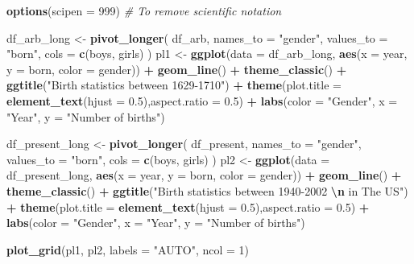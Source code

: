 \documentclass[11pt,a4paper,]{article}
\newenvironment{Shaded}{\begin{snugshade}}{\end{snugshade}}
\newcommand{\AttributeTok}[1]{\textcolor[rgb]{0.13,0.29,0.53}{#1}}
\newcommand{\CommentTok}[1]{\textcolor[rgb]{0.56,0.35,0.01}{\textit{#1}}}
\newcommand{\DecValTok}[1]{\textcolor[rgb]{0.00,0.00,0.81}{#1}}
\newcommand{\FloatTok}[1]{\textcolor[rgb]{0.00,0.00,0.81}{#1}}
\newcommand{\FunctionTok}[1]{\textcolor[rgb]{0.13,0.29,0.53}{\textbf{#1}}}
\newcommand{\NormalTok}[1]{#1}
\newcommand{\OtherTok}[1]{\textcolor[rgb]{0.56,0.35,0.01}{#1}}
\newcommand{\SpecialCharTok}[1]{\textcolor[rgb]{0.81,0.36,0.00}{\textbf{#1}}}
\newcommand{\StringTok}[1]{\textcolor[rgb]{0.31,0.60,0.02}{#1}}
\begin{document}
\begin{Shaded}
\begin{Highlighting}[]
\FunctionTok{options}\NormalTok{(}\AttributeTok{scipen =} \DecValTok{999}\NormalTok{) }\CommentTok{\# To remove scientific notation}

\NormalTok{df\_arb\_long }\OtherTok{\textless{}{-}}
  \FunctionTok{pivot\_longer}\NormalTok{(}
\NormalTok{    df\_arb,}
    \AttributeTok{names\_to =} \StringTok{"gender"}\NormalTok{,}
    \AttributeTok{values\_to =} \StringTok{"born"}\NormalTok{,}
    \AttributeTok{cols =} \FunctionTok{c}\NormalTok{(boys, girls)}
\NormalTok{  )}
\NormalTok{pl1 }\OtherTok{\textless{}{-}}
  \FunctionTok{ggplot}\NormalTok{(}\AttributeTok{data =}\NormalTok{ df\_arb\_long, }\FunctionTok{aes}\NormalTok{(}\AttributeTok{x =}\NormalTok{ year, }\AttributeTok{y =}\NormalTok{ born, }\AttributeTok{color =}\NormalTok{ gender)) }\SpecialCharTok{+} 
  \FunctionTok{geom\_line}\NormalTok{() }\SpecialCharTok{+} \FunctionTok{theme\_classic}\NormalTok{() }\SpecialCharTok{+} 
  \FunctionTok{ggtitle}\NormalTok{(}\StringTok{"Birth statistics between 1629{-}1710"}\NormalTok{) }\SpecialCharTok{+} 
  \FunctionTok{theme}\NormalTok{(}\AttributeTok{plot.title =} \FunctionTok{element\_text}\NormalTok{(}\AttributeTok{hjust =} \FloatTok{0.5}\NormalTok{),}\AttributeTok{aspect.ratio =} \FloatTok{0.5}\NormalTok{) }\SpecialCharTok{+} 
  \FunctionTok{labs}\NormalTok{(}\AttributeTok{color =} \StringTok{"Gender"}\NormalTok{, }\AttributeTok{x =} \StringTok{"Year"}\NormalTok{, }\AttributeTok{y =} \StringTok{"Number of births"}\NormalTok{)}


\NormalTok{df\_present\_long }\OtherTok{\textless{}{-}}
  \FunctionTok{pivot\_longer}\NormalTok{(}
\NormalTok{    df\_present,}
    \AttributeTok{names\_to =} \StringTok{"gender"}\NormalTok{,}
    \AttributeTok{values\_to =} \StringTok{"born"}\NormalTok{,}
    \AttributeTok{cols =} \FunctionTok{c}\NormalTok{(boys, girls)}
\NormalTok{  )}
\NormalTok{pl2 }\OtherTok{\textless{}{-}}
  \FunctionTok{ggplot}\NormalTok{(}\AttributeTok{data =}\NormalTok{ df\_present\_long, }\FunctionTok{aes}\NormalTok{(}\AttributeTok{x =}\NormalTok{ year, }\AttributeTok{y =}\NormalTok{ born, }\AttributeTok{color =}\NormalTok{ gender)) }\SpecialCharTok{+} 
  \FunctionTok{geom\_line}\NormalTok{() }\SpecialCharTok{+} 
  \FunctionTok{theme\_classic}\NormalTok{() }\SpecialCharTok{+} 
  \FunctionTok{ggtitle}\NormalTok{(}\StringTok{"Birth statistics between 1940{-}2002 }\SpecialCharTok{\textbackslash{}n}\StringTok{ in The US"}\NormalTok{) }\SpecialCharTok{+} 
  \FunctionTok{theme}\NormalTok{(}\AttributeTok{plot.title =} \FunctionTok{element\_text}\NormalTok{(}\AttributeTok{hjust =} \FloatTok{0.5}\NormalTok{),}\AttributeTok{aspect.ratio =} \FloatTok{0.5}\NormalTok{) }\SpecialCharTok{+} 
  \FunctionTok{labs}\NormalTok{(}\AttributeTok{color =} \StringTok{"Gender"}\NormalTok{, }\AttributeTok{x =} \StringTok{"Year"}\NormalTok{, }\AttributeTok{y =} \StringTok{"Number of births"}\NormalTok{)}

\FunctionTok{plot\_grid}\NormalTok{(pl1, pl2, }\AttributeTok{labels =} \StringTok{"AUTO"}\NormalTok{, }\AttributeTok{ncol =} \DecValTok{1}\NormalTok{)}
\end{Highlighting}
\end{Shaded}
\end{document}
